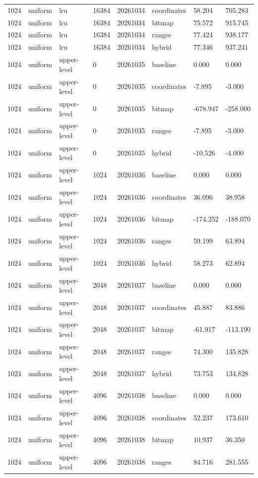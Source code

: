 \begin{tabular}{llllllll}
1024 & uniform & lru & 16384 & 20261034 & coordinates & 58.204 & 705.283 \\
1024 & uniform & lru & 16384 & 20261034 & bitmap & 75.572 & 915.745 \\
1024 & uniform & lru & 16384 & 20261034 & ranges & 77.424 & 938.177 \\
1024 & uniform & lru & 16384 & 20261034 & hybrid & 77.346 & 937.241 \\
1024 & uniform & upper-level & 0 & 20261035 & baseline & 0.000 & 0.000 \\
1024 & uniform & upper-level & 0 & 20261035 & coordinates & -7.895 & -3.000 \\
1024 & uniform & upper-level & 0 & 20261035 & bitmap & -678.947 & -258.000 \\
1024 & uniform & upper-level & 0 & 20261035 & ranges & -7.895 & -3.000 \\
1024 & uniform & upper-level & 0 & 20261035 & hybrid & -10.526 & -4.000 \\
1024 & uniform & upper-level & 1024 & 20261036 & baseline & 0.000 & 0.000 \\
1024 & uniform & upper-level & 1024 & 20261036 & coordinates & 36.096 & 38.958 \\
1024 & uniform & upper-level & 1024 & 20261036 & bitmap & -174.252 & -188.070 \\
1024 & uniform & upper-level & 1024 & 20261036 & ranges & 59.199 & 63.894 \\
1024 & uniform & upper-level & 1024 & 20261036 & hybrid & 58.273 & 62.894 \\
1024 & uniform & upper-level & 2048 & 20261037 & baseline & 0.000 & 0.000 \\
1024 & uniform & upper-level & 2048 & 20261037 & coordinates & 45.887 & 83.886 \\
1024 & uniform & upper-level & 2048 & 20261037 & bitmap & -61.917 & -113.190 \\
1024 & uniform & upper-level & 2048 & 20261037 & ranges & 74.300 & 135.828 \\
1024 & uniform & upper-level & 2048 & 20261037 & hybrid & 73.753 & 134.828 \\
1024 & uniform & upper-level & 4096 & 20261038 & baseline & 0.000 & 0.000 \\
1024 & uniform & upper-level & 4096 & 20261038 & coordinates & 52.237 & 173.610 \\
1024 & uniform & upper-level & 4096 & 20261038 & bitmap & 10.937 & 36.350 \\
1024 & uniform & upper-level & 4096 & 20261038 & ranges & 84.716 & 281.555 \\

\end{tabular}
